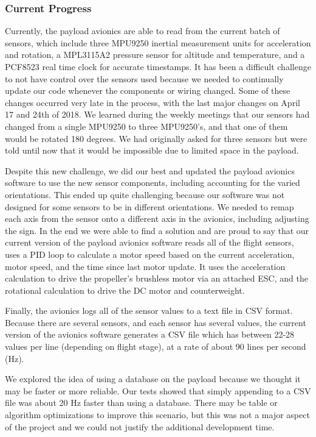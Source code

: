 \documentclass[onecolumn, draftclsnofoot, 10pt, compsoc]{IEEEtran}
\begin{document}
\subsubsection{Current Progress}
Currently, the payload avionics are able to read from the current batch of sensors, which include three MPU9250 inertial measurement units for acceleration and rotation, a MPL3115A2 pressure sensor for altitude and temperature, and a PCF8523 real time clock for accurate timestamps.  It has been a difficult challenge to not have control over the sensors used because we needed to continually update our code whenever the components or wiring changed. Some of these changes occurred very late in the process, with the last major changes on April 17 and 24th of 2018.  We learned during the weekly meetings that our sensors had changed from a single MPU9250 to three MPU9250's, and that one of them would be rotated 180 degrees.  We had originally asked for three sensors but were told until now that it would be impossible due to limited space in the payload.

Despite this new challenge, we did our best and updated the payload avionics software to use the new sensor components, including accounting for the varied orientations.  This ended up quite challenging because our software was not designed for some sensors to be in different orientations.  We needed to remap each axis from the sensor onto a different axis in the avionics, including adjusting the sign.  In the end we were able to find a solution and are proud to say that our current version of the payload avionics software reads all of the flight sensors, uses a PID loop to calculate a motor speed based on the current acceleration, motor speed, and the time since last motor update.  It uses the acceleration calculation to drive the propeller's brushless motor via an attached ESC, and the rotational calculation to drive the DC motor and counterweight.

Finally, the avionics logs all of the sensor values to a text file in CSV format.  Because there are several sensors, and each sensor has several values, the current version of the avionics software generates a CSV file which has between 22-28 values per line (depending on flight stage), at a rate of about 90 lines per second (Hz).

We explored the idea of using a database on the payload because we thought it may be faster or more reliable.  Our tests showed that simply appending to a CSV file was about 20 Hz faster than using a database.  There may be table or algorithm optimizations to improve this scenario, but this was not a major aspect of the project and we could not justify the additional development time.
\end{document}
